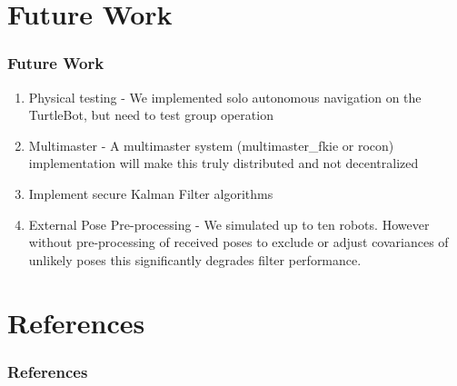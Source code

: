 \documentclass[14pt]{beamer}
\begin{document}
\section{Future Work}
\begin{frame}
\frametitle{Future Work}
\begin{enumerate}
\item Physical testing - We implemented solo autonomous navigation on the TurtleBot, but need to test group operation
\pause
\item Multimaster - A multimaster system (multimaster\_fkie or rocon) implementation will make this truly distributed and not decentralized
\pause
\item Implement secure Kalman Filter algorithms
\pause
\item External Pose Pre-processing - We simulated up to ten robots. However without pre-processing of received poses to exclude or adjust covariances of unlikely poses this significantly degrades filter performance.
\end{enumerate}
\end{frame}

\section{References}
\begingroup
\tiny
\begin{frame}[allowframebreaks]
\frametitle{References}
\printbibliography
\end{frame}
\endgroup
\end{document}
